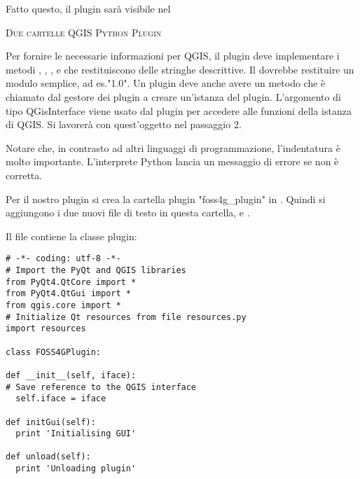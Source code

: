 Fatto questo, il plugin sarà visibile nel 

\begin{Tip}\caption{\textsc{Due cartelle QGIS Python Plugin}}
\end{Tip}

Per fornire le necessarie informazioni per QGIS, il plugin deve implementare i metodi , , ,
 e  che restituiscono delle stringhe descrittive.
Il  dovrebbe restituire un modulo semplice, ad es."1.0". Un plugin deve anche avere un metodo
 che è chiamato dal gestore dei plugin a creare un'istanza del plugin. L'argomento di tipo QGisInterface viene usato dal plugin per accedere alle funzioni della istanza di QGIS. Si lavorerà con quest'oggetto nel passaggio 2.

Notare che, in contrasto ad altri linguaggi di programmazione, l'indentatura è molto importante. L'interprete Python lancia un messaggio di errore se non è corretta.

Per il nostro plugin si crea la cartella plugin "foss4g\_plugin" in
. Quindi si aggiungono i due nuovi file di testo in questa cartella,  e .

Il file  contiene la classe plugin:

\begin{verbatim}
# -*- coding: utf-8 -*-
# Import the PyQt and QGIS libraries
from PyQt4.QtCore import *
from PyQt4.QtGui import *
from qgis.core import *
# Initialize Qt resources from file resources.py
import resources

class FOSS4GPlugin:

def __init__(self, iface):
# Save reference to the QGIS interface
  self.iface = iface

def initGui(self):
  print 'Initialising GUI'

def unload(self):
  print 'Unloading plugin'
\end{verbatim}


